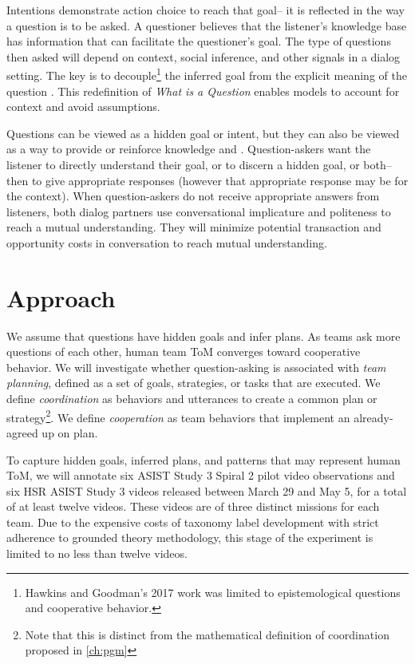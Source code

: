 Intentions demonstrate action choice to reach that goal-- it is reflected in the way a question is to be asked. A questioner believes that the listener’s knowledge base has information that can facilitate the questioner’s goal.  The type of questions then asked will depend on context, social inference, and other signals in a dialog setting. The key is to decouple\footnote{Hawkins and Goodman's 2017 work was limited to epistemological questions and cooperative behavior.} the inferred goal from the explicit meaning of the question \citet{hawkins_goodman_2017}. This redefinition of \emph{What is a Question} enables models to account for context and avoid assumptions. 

Questions can be viewed as a hidden goal or intent, but they can also be viewed as a way to provide or reinforce knowledge \citet{alaimi_2020} and \citet{ray_2001}. Question-askers want the listener to directly understand their goal, or to discern a hidden goal, or both-- then to give appropriate responses (however that appropriate response may be for the context). When question-askers do not receive appropriate answers from listeners, both dialog partners use conversational implicature and politeness to reach a mutual understanding. They will minimize potential transaction and opportunity costs in conversation to reach mutual understanding.  




\section{Approach}

We assume that questions have hidden goals and infer plans. As teams ask more
questions of each other, human team ToM converges toward cooperative behavior.
We will investigate whether question-asking is associated with \emph{team
planning}, defined as a set of goals, strategies, or tasks that are executed.
We define \emph{coordination} as behaviors and utterances to create a common
plan or strategy\footnote{Note that this is distinct from the mathematical
definition of coordination proposed in \autoref{ch:pgm}}. We define
\emph{cooperation} as team behaviors that implement an already-agreed up on
plan.

To capture hidden goals, inferred plans, and patterns that may represent human
ToM, we will annotate six ASIST Study 3 Spiral 2 pilot video observations and
six HSR ASIST Study 3 videos released between March 29 and May 5, for a total
of at least twelve videos. These videos are of three distinct missions for each
team. Due to the expensive costs of taxonomy label development with strict
adherence to grounded theory methodology, this stage of the experiment is
limited to no less than twelve videos. 


